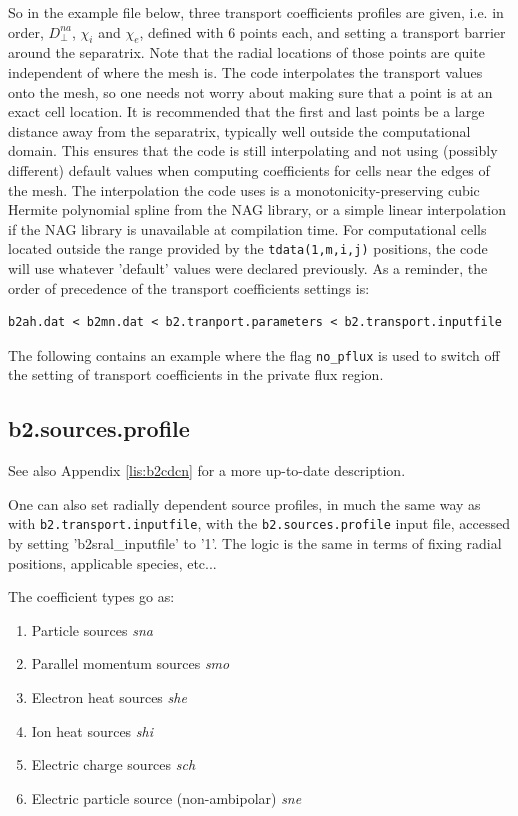 \documentclass[a4paper,10pt]{report}
\begin{document}
So in the example file below, three transport coefficients profiles
are given, i.e. in order, $D_\perp^{na}$, $\chi_i$ and $\chi_e$, defined
with 6 points each, and setting a transport barrier around the separatrix.
Note that the radial locations of those points are quite
independent of where the mesh is. The code interpolates the transport
values onto the mesh, so one needs not worry about making sure
that a point is at an exact cell location.
It is recommended that the first and last points be a large distance away
from the separatrix, typically well outside the computational
domain. This ensures that the code is still interpolating and not
using (possibly different) default values when computing coefficients for cells near the
edges of the mesh. The interpolation the code uses is a
monotonicity-preserving cubic Hermite polynomial spline from the NAG
library, or a simple linear interpolation if the NAG library is
unavailable at compilation time. For computational cells located
outside the range provided by the {\tt tdata(1,m,i,j)} positions,
the code will use whatever
'default' values were declared previously. As a reminder, the order of
precedence of the transport coefficients settings is:
\begin{verbatim}
b2ah.dat < b2mn.dat < b2.tranport.parameters < b2.transport.inputfile
\end{verbatim}

The following contains an example where the flag {\tt no\_pflux} is
used to switch off the setting of transport coefficients in the
private flux region.


\subsection{b2.sources.profile}
\label{lab:b2:sources:profile}

See also Appendix \ref{lis:b2cdcn} for a more up-to-date description.

One can also set radially dependent source profiles, in much the same way as with
{\tt b2.transport.inputfile}, with the {\tt b2.sources.profile} input file,
accessed by setting 'b2sral\_inputfile' to '1'. The logic is the same in terms
of fixing radial positions, applicable species, etc...

The coefficient types go as:
\begin{enumerate}
   \item Particle sources {\em sna} 
   \item Parallel momentum sources {\em smo} 
   \item Electron heat sources {\em she} 
   \item Ion heat sources {\em shi} 
   \item Electric charge sources {\em sch} 
   \item Electric particle source (non-ambipolar) {\em sne} 
\end{enumerate}
\end{document}
